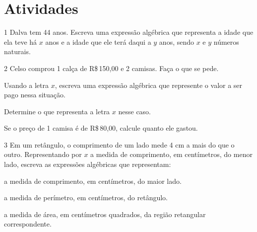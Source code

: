 \section*{Atividades}

\num{1} Dalva tem 44 anos. Escreva uma expressão algébrica que representa a
idade que ela teve há $x$ anos e a idade que ele terá daqui a $y$ anos,
sendo $x$ e $y$ números naturais.




\num{2} Celso comprou 1 calça de R\$\,150,00 e 2 camisas. Faça o que se pede.

\begin{escolha}[itemsep=0pt]
\item Usando a letra $x$, escreva uma expressão algébrica que represente o valor a ser pago nessa situação.



\item Determine o que representa a letra $x$ nesse caso.\\

\item Se o preço de 1 camisa é de R\$\,80,00, calcule quanto ele gastou.


\end{escolha}

\num{3} Em um retângulo, o comprimento de um lado mede 4 cm a mais do que o
outro. Representando por $x$ a medida de comprimento, em centímetros, do
menor lado, escreva as expressões algébricas que representam:


\begin{escolha}[itemsep=0pt]
\item a medida de comprimento, em centímetros, do maior lado.
\item a medida de perímetro, em centímetros, do retângulo.
\item a medida de área, em centímetros quadrados, da região retangular correspondente.
\end{escolha}

